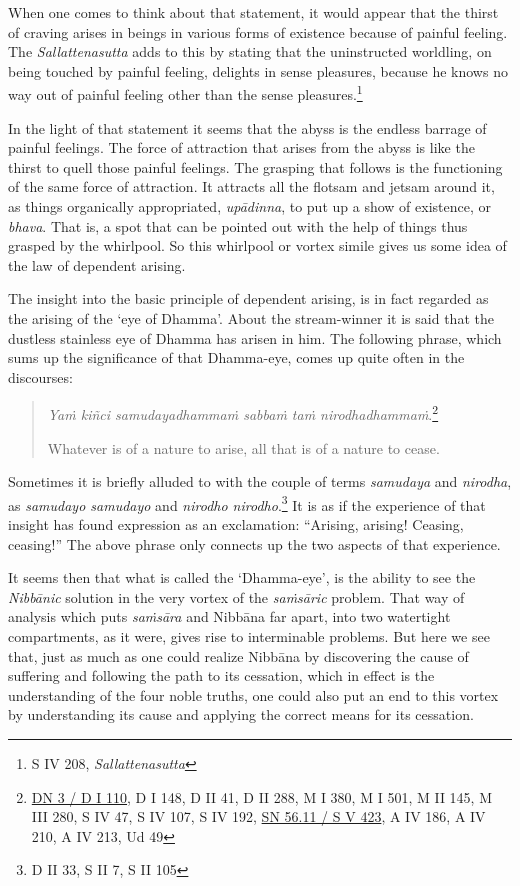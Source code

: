When one comes to think about that statement, it would appear that the thirst of craving arises in beings in various forms of existence because of painful feeling. The \emph{Sallattenasutta} adds to this by stating that the uninstructed worldling, on being touched by painful feeling, delights in sense pleasures, because he knows no way out of painful feeling other than the sense pleasures.\footnote{S IV 208, \emph{Sallattenasutta}}

In the light of that statement it seems that the abyss is the endless barrage of painful feelings. The force of attraction that arises from the abyss is like the thirst to quell those painful feelings. The grasping that follows is the functioning of the same force of attraction. It attracts all the flotsam and jetsam around it, as things organically appropriated, \emph{upādinna}, to put up a show of existence, or \emph{bhava}. That is, a spot that can be pointed out with the help of things thus grasped by the whirlpool. So this whirlpool or vortex simile gives us some idea of the law of dependent arising.

The insight into the basic principle of dependent arising, is in fact regarded as the arising of the `eye of Dhamma'. About the stream-winner it is said that the dustless stainless eye of Dhamma has arisen in him. The following phrase, which sums up the significance of that Dhamma-eye, comes up quite often in the discourses:

\begin{quote}
\emph{Yaṁ kiñci samudayadhammaṁ sabbaṁ taṁ nirodhadhammaṁ}.\footnote{\href{https://suttacentral.net/dn3/pli/ms}{DN 3 / D I 110}, D I 148, D II 41, D II 288, M I 380, M I 501, M II 145, M III 280, S IV 47, S IV 107, S IV 192, \href{https://suttacentral.net/sn56.11/pli/ms}{SN 56.11 / S V 423}, A IV 186, A IV 210, A IV 213, Ud 49}

Whatever is of a nature to arise, all that is of a nature to cease.
\end{quote}

Sometimes it is briefly alluded to with the couple of terms \emph{samudaya} and \emph{nirodha}, as \emph{samudayo samudayo} and \emph{nirodho nirodho}.\footnote{D II 33, S II 7, S II 105} It is as if the experience of that insight has found expression as an exclamation: ``Arising, arising! Ceasing, ceasing!'' The above phrase only connects up the two aspects of that experience.

It seems then that what is called the `Dhamma-eye', is the ability to see the \emph{Nibbānic} solution in the very vortex of the \emph{saṁsāric} problem. That way of analysis which puts \emph{saṁsāra} and Nibbāna far apart, into two watertight compartments, as it were, gives rise to interminable problems. But here we see that, just as much as one could realize Nibbāna by discovering the cause of suffering and following the path to its cessation, which in effect is the understanding of the four noble truths, one could also put an end to this vortex by understanding its cause and applying the correct means for its cessation.

